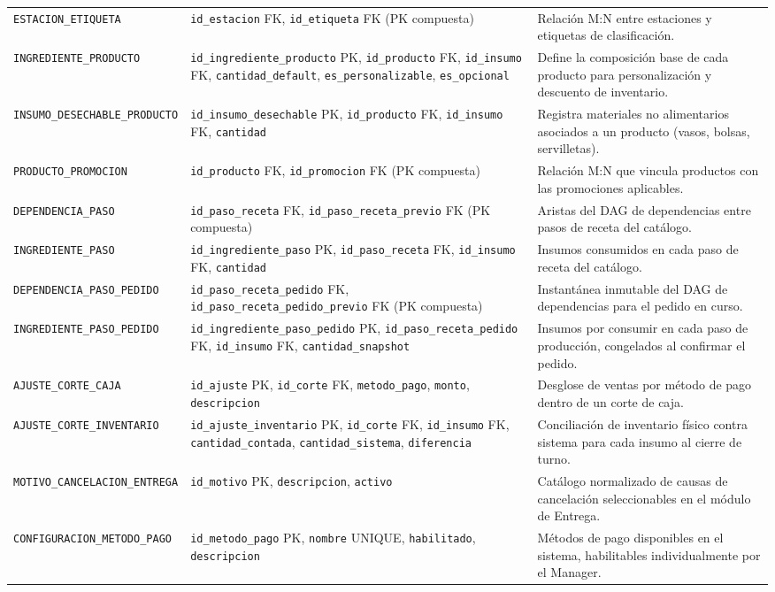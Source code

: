 \begin{tabularx}{\textwidth}{l p{6cm} X}
\texttt{ESTACION\_ETIQUETA} & \texttt{id\_estacion} FK, \texttt{id\_etiqueta} FK (PK compuesta) & Relación M:N entre estaciones y etiquetas de clasificación. \\
\addlinespace
\texttt{INGREDIENTE\_PRODUCTO} & \texttt{id\_ingrediente\_producto} PK, \texttt{id\_producto} FK, \texttt{id\_insumo} FK, \texttt{cantidad\_default}, \texttt{es\_personalizable}, \texttt{es\_opcional} & Define la composición base de cada producto para personalización y descuento de inventario. \\
\addlinespace
\texttt{INSUMO\_DESECHABLE\_PRODUCTO} & \texttt{id\_insumo\_desechable} PK, \texttt{id\_producto} FK, \texttt{id\_insumo} FK, \texttt{cantidad} & Registra materiales no alimentarios asociados a un producto (vasos, bolsas, servilletas). \\
\addlinespace
\texttt{PRODUCTO\_PROMOCION} & \texttt{id\_producto} FK, \texttt{id\_promocion} FK (PK compuesta) & Relación M:N que vincula productos con las promociones aplicables. \\
\addlinespace
\texttt{DEPENDENCIA\_PASO} & \texttt{id\_paso\_receta} FK, \texttt{id\_paso\_receta\_previo} FK (PK compuesta) & Aristas del DAG de dependencias entre pasos de receta del catálogo. \\
\addlinespace
\texttt{INGREDIENTE\_PASO} & \texttt{id\_ingrediente\_paso} PK, \texttt{id\_paso\_receta} FK, \texttt{id\_insumo} FK, \texttt{cantidad} & Insumos consumidos en cada paso de receta del catálogo. \\
\addlinespace
\texttt{DEPENDENCIA\_PASO\_PEDIDO} & \texttt{id\_paso\_receta\_pedido} FK, \texttt{id\_paso\_receta\_pedido\_previo} FK (PK compuesta) & Instantánea inmutable del DAG de dependencias para el pedido en curso. \\
\addlinespace
\texttt{INGREDIENTE\_PASO\_PEDIDO} & \texttt{id\_ingrediente\_paso\_pedido} PK, \texttt{id\_paso\_receta\_pedido} FK, \texttt{id\_insumo} FK, \texttt{cantidad\_snapshot} & Insumos por consumir en cada paso de producción, congelados al confirmar el pedido. \\
\addlinespace
\texttt{AJUSTE\_CORTE\_CAJA} & \texttt{id\_ajuste} PK, \texttt{id\_corte} FK, \texttt{metodo\_pago}, \texttt{monto}, \texttt{descripcion} & Desglose de ventas por método de pago dentro de un corte de caja. \\
\addlinespace
\texttt{AJUSTE\_CORTE\_INVENTARIO} & \texttt{id\_ajuste\_inventario} PK, \texttt{id\_corte} FK, \texttt{id\_insumo} FK, \texttt{cantidad\_contada}, \texttt{cantidad\_sistema}, \texttt{diferencia} & Conciliación de inventario físico contra sistema para cada insumo al cierre de turno. \\
\addlinespace
\texttt{MOTIVO\_CANCELACION\_ENTREGA} & \texttt{id\_motivo} PK, \texttt{descripcion}, \texttt{activo} & Catálogo normalizado de causas de cancelación seleccionables en el módulo de Entrega. \\
\addlinespace
\texttt{CONFIGURACION\_METODO\_PAGO} & \texttt{id\_metodo\_pago} PK, \texttt{nombre} UNIQUE, \texttt{habilitado}, \texttt{descripcion} & Métodos de pago disponibles en el sistema, habilitables individualmente por el Manager. \\
\end{tabularx}
